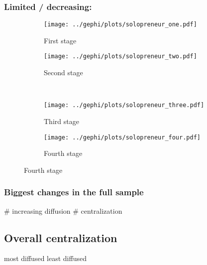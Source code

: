 \documentclass[a4paper, abstract=on]{scrartcl}
\begin{document}
    \subsubsection{Limited / decreasing: }

      \begin{figure}[H]
        \caption{Social network of diffusion for  over time.}
        \centering
        \begin{subfigure}{.45\linewidth}
          \caption{First stage}
          \centering
          \texttt{[image: ../gephi/plots/solopreneur\_one.pdf]}
        \end{subfigure}
        \begin{subfigure}{.45\linewidth}
          \caption{Second stage}
          \centering
          \texttt{[image: ../gephi/plots/solopreneur\_two.pdf]}
        \end{subfigure}\\
        \begin{subfigure}{.45\linewidth}
          \caption{Third stage}
          \centering
          \texttt{[image: ../gephi/plots/solopreneur\_three.pdf]}
        \end{subfigure}
        \begin{subfigure}{.45\linewidth}
          \caption{Fourth stage}
          \centering
          \texttt{[image: ../gephi/plots/solopreneur\_four.pdf]}
        \end{subfigure}
      \end{figure}

    \subsubsection{Biggest changes in the full sample}

      \begin{easylist}[itemize]
        # increasing diffusion
        # centralization
      \end{easylist}

  \subsection{Overall centralization}

    most diffused
    least diffused
\end{document}
